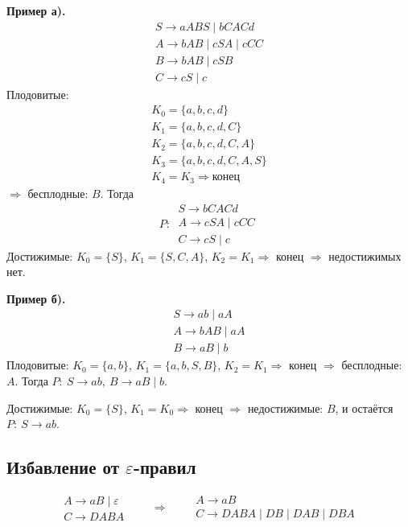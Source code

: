\documentclass[11pt,a4paper]{article}
\newcommand{\rul}{\rightarrow}
\begin{document}
\textbf{Пример а).}
\[
\begin{array}{l}
S\rul aABS\mid bCACd\\ A\rul bAB\mid cSA\mid cCC\\ B\rul bAB\mid cSB\\ C\rul cS\mid c
\end{array}
\]
Плодовитые:
\[
\begin{array}{l}
K_0=\{a,b,c,d\}\\ K_1=\{a,b,c,d,C\}\\ K_2=\{a,b,c,d,C,A\}\\ K_3=\{a,b,c,d,C,A,S\}\\ K_4=K_3\Rightarrow\text{конец}
\end{array}
\]
$\Rightarrow$ бесплодные: $B$. Тогда
\[
P:\ \begin{array}{l}S\rul bCACd\\ A\rul cSA\mid cCC\\ C\rul cS\mid c\end{array}
\]
Достижимые: $K_0=\{S\}$, $K_1=\{S,C,A\}$, $K_2=K_1\Rightarrow$ конец $\Rightarrow$ недостижимых нет.

\textbf{Пример б).}
\[
\begin{array}{l}
S\rul ab\mid aA\\ A\rul bAB\mid aA\\ B\rul aB\mid b
\end{array}
\]
Плодовитые: $K_0=\{a,b\}$, $K_1=\{a,b,S,B\}$, $K_2=K_1\Rightarrow$ конец $\Rightarrow$ бесплодные: $A$. Тогда
$P:\ S\rul ab,\ B\rul aB\mid b$.

Достижимые: $K_0=\{S\}$, $K_1=K_0\Rightarrow$ конец $\Rightarrow$ недостижимые: $B$, и остаётся $P:\ S\rul ab$.

\subsection{Избавление от \texorpdfstring{$\varepsilon$}{ε}-правил}

\[
\begin{array}{l}A\rul aB\mid\varepsilon\\ C\rul DABA\end{array}
\qquad\Longrightarrow\qquad
\begin{array}{l}A\rul aB\\ C\rul DABA\mid DB\mid DAB\mid DBA\end{array}
\]
\end{document}
